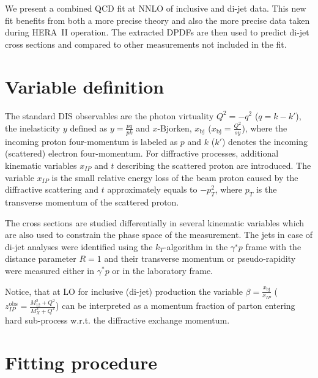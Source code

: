 \documentclass{PoS}
\newcommand{\IP}{I\!\!P}
\begin{document}
We present a combined QCD fit at NNLO of inclusive and di-jet data.
This new fit benefits from both a more precise theory and also the more precise  data taken during HERA~II operation.
The extracted DPDFs are then used to predict di-jet cross sections and compared to other measurements not included in the fit. 


\section{Variable definition}
The standard DIS observables are the photon virtuality $Q^2 = -q^2$ ($q = k - k'$), the inelasticity $y$ defined as $y = \frac{pq}{pk}$ and $x$-Bjorken, $x_\mathrm{bj}$ ($x_\mathrm{bj}=\frac{Q^2}{sy}$), where the incoming proton four-momentum is labeled as $p$ and $k$ ($k'$) denotes the incoming (scattered) electron four-momentum. 
For diffractive processes, additional kinematic variables $x_{\IP}$ and  $t$ describing the scattered proton are introduced.
The variable $x_{\IP}$ is the small relative energy loss of the beam proton caused by the diffractive scattering and $t$ approximately equals to  $-p_T^2$, where $p_T$ is the transverse momentum of the scattered proton.

The cross sections are studied differentially in several kinematic variables which are also used to constrain the phase space of the measurement.
The jets in case of di-jet analyses were identified using the $k_T$-algorithm in the $\gamma^{∗}p$ frame with the distance parameter $R = 1$ and their transverse momentum or pseudo-rapidity were measured either in $\gamma^{*}p$ or in the laboratory frame.

Notice, that at LO for inclusive (di-jet) production the variable $\beta = \frac{x_\mathrm{bj}}{x_{\IP}}$ ($z^\mathrm{obs}_{\IP} = \frac{M_{12}^2 + Q^2}{M_X^2 + Q^2}$) can be interpreted as a momentum fraction of parton entering hard sub-process w.r.t. the diffractive exchange momentum.



\section{Fitting procedure}
\end{document}
